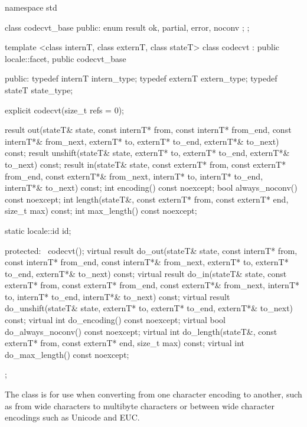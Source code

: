 %
\begin{codeblock}
namespace std {
  class codecvt_base {
  public:
    enum result { ok, partial, error, noconv };
  };

  template <class internT, class externT, class stateT>
  class codecvt : public locale::facet, public codecvt_base {
  public:
    typedef internT  intern_type;
    typedef externT  extern_type;
    typedef stateT state_type;

    explicit codecvt(size_t refs = 0);

    result out(stateT& state,
               const internT* from, const internT* from_end, const internT*& from_next,
               externT*   to,       externT* to_end, externT*& to_next) const;
    result unshift(stateT& state,
                   externT*   to,        externT* to_end, externT*& to_next) const;
    result in(stateT& state,
              const externT* from, const externT* from_end, const externT*& from_next,
              internT*   to,       internT* to_end, internT*& to_next) const;
    int encoding() const noexcept;
    bool always_noconv() const noexcept;
    int length(stateT&, const externT* from, const externT* end,
               size_t max) const;
    int max_length() const noexcept;

    static locale::id id;

  protected:
    ~codecvt();
    virtual result do_out(stateT& state,
                          const internT* from, const internT* from_end, const internT*& from_next,
                          externT* to,         externT* to_end, externT*& to_next) const;
    virtual result do_in(stateT& state,
                         const externT* from, const externT* from_end, const externT*& from_next,
                         internT* to,         internT* to_end, internT*& to_next) const;
    virtual result do_unshift(stateT& state,
                              externT* to,         externT* to_end, externT*& to_next) const;
    virtual int do_encoding() const noexcept;
    virtual bool do_always_noconv() const noexcept;
    virtual int do_length(stateT&, const externT* from,
                          const externT* end, size_t max) const;
    virtual int do_max_length() const noexcept;
  };
}
\end{codeblock}

\pnum
The class
is for use when
converting from one character encoding to another, such as from wide characters
to multibyte  characters or between wide character encodings such as
Unicode and EUC.

